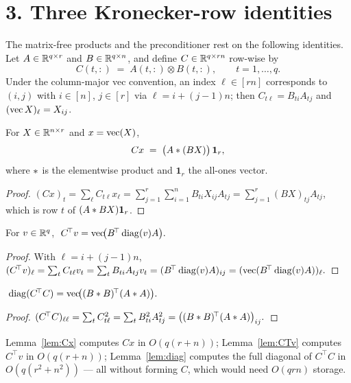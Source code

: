 \documentclass[11pt]{article}
\begin{document}
\section*{3. Three Kronecker-row identities}

The matrix-free products and the preconditioner rest on the following
identities. Let $A\in\mathbb{R}^{q\times r}$ and $B\in\mathbb{R}^{q\times n}$, and define
$C\in\mathbb{R}^{q\times rn}$ row-wise by
\begin{equation}\label{eq:Crows}
  C(t,:) \;=\; A(t,:)\otimes B(t,:),\qquad t=1,\dots,q.
\end{equation}
Under the column-major vec convention, an index $\ell\in[rn]$ corresponds to
$(i,j)$ with $i\in[n]$, $j\in[r]$ via $\ell=i+(j-1)n$; then
$C_{t\ell}=B_{ti}A_{tj}$ and $(\operatorname{vec} X)_\ell=X_{ij}$.

\begin{qtenlemma}\label{lem:Cx}
For $X\in\mathbb{R}^{n\times r}$ and $x=\operatorname{vec}(X)$,
\[
  Cx \;=\; \bigl(A\ast (BX)\bigr)\,\mathbf 1_r,
\]
where $\ast$ is the elementwise product and $\mathbf 1_r$ the all-ones vector.
\end{qtenlemma}
\begin{proof}
$(Cx)_t=\sum_{\ell}C_{t\ell}x_\ell=\sum_{j=1}^r\sum_{i=1}^n B_{ti}X_{ij}A_{tj}
 =\sum_{j=1}^r (BX)_{tj}A_{tj}$, which is row $t$ of $(A\ast BX)\mathbf 1_r$.
\end{proof}

\begin{qtenlemma}\label{lem:CTv}
For $v\in\mathbb{R}^q$, $\;C^{\!\top}v=\operatorname{vec}\!\bigl(B^{\!\top}\operatorname{diag}(v)A\bigr).$
\end{qtenlemma}
\begin{proof}
With $\ell=i+(j-1)n$,
$(C^{\!\top}v)_\ell=\sum_t C_{t\ell}v_t=\sum_t B_{ti}A_{tj}v_t
 =(B^{\!\top}\operatorname{diag}(v)A)_{ij}=(\operatorname{vec}(B^{\!\top}\operatorname{diag}(v)A))_\ell.$
\end{proof}

\begin{qtenlemma}\label{lem:diag}
$\;\operatorname{diag}(C^{\!\top}C)=\operatorname{vec}\!\bigl((B\ast B)^{\!\top}(A\ast A)\bigr).$
\end{qtenlemma}
\begin{proof}
$(C^{\!\top}C)_{\ell\ell}=\sum_t C_{t\ell}^2=\sum_t B_{ti}^2A_{tj}^2
 =\bigl((B\ast B)^{\!\top}(A\ast A)\bigr)_{ij}.$
\end{proof}

\noindent Lemma~\ref{lem:Cx} computes $Cx$ in $O(q(r+n))$; Lemma~\ref{lem:CTv}
computes $C^{\!\top}v$ in $O(q(r+n))$; Lemma~\ref{lem:diag} computes the full
diagonal of $C^{\!\top}C$ in $O(q(r^2+n^2))$ — all without forming $C$, which
would need $O(qrn)$ storage.
\end{document}
